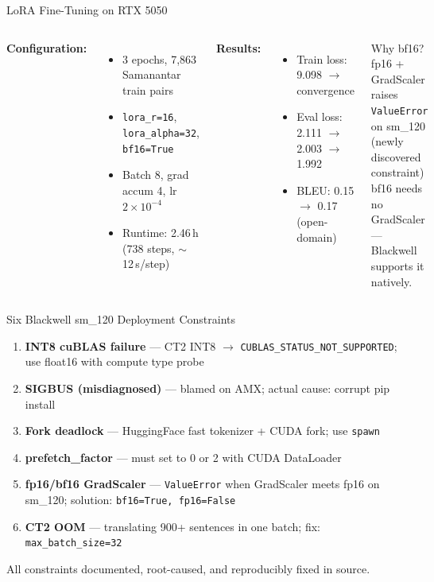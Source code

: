 \documentclass[aspectratio=169,10pt]{beamer}
\begin{document}
\begin{frame}{LoRA Fine-Tuning on RTX 5050}
  \begin{columns}
    \textbf{Configuration:}
    \begin{itemize}
      \item 3 epochs, 7,863 Samanantar train pairs
      \item \texttt{lora\_r=16}, \texttt{lora\_alpha=32}, \texttt{bf16=True}
      \item Batch 8, grad accum 4, lr $2\times10^{-4}$
      \item Runtime: 2.46\,h (738 steps, $\sim$12\,s/step)
    \end{itemize}
    \vspace{0.2cm}
    \textbf{Results:}
    \begin{itemize}
      \item Train loss: 9.098 $\to$ convergence
      \item Eval loss: 2.111 $\to$ 2.003 $\to$ 1.992
      \item BLEU: 0.15 $\to$ 0.17 (open-domain)
    \end{itemize}

    \begin{block}{Why bf16?}
      fp16 + GradScaler raises\\
      \texttt{ValueError} on sm\_120\\
      (newly discovered constraint)\\
      bf16 needs no GradScaler ---\\
      Blackwell supports it natively.
    \end{block}
  \end{columns}
\end{frame}

\begin{frame}{Six Blackwell sm\_120 Deployment Constraints}
  \begin{enumerate}
    \item \textbf{INT8 cuBLAS failure} --- CT2 INT8 $\to$ \texttt{CUBLAS\_STATUS\_NOT\_SUPPORTED};
          use float16 with compute type probe
    \item \textbf{SIGBUS (misdiagnosed)} --- blamed on AMX; actual cause: corrupt pip install
    \item \textbf{Fork deadlock} --- HuggingFace fast tokenizer + CUDA fork; use \texttt{spawn}
    \item \textbf{prefetch\_factor} --- must set to 0 or 2 with CUDA DataLoader
    \item \textbf{fp16/bf16 GradScaler} --- \texttt{ValueError} when GradScaler meets fp16 on sm\_120;
          solution: \texttt{bf16=True, fp16=False}
    \item \textbf{CT2 OOM} --- translating 900+ sentences in one batch; fix: \texttt{max\_batch\_size=32}
  \end{enumerate}
  All constraints documented, root-caused, and reproducibly fixed in source.
\end{frame}
\end{document}

